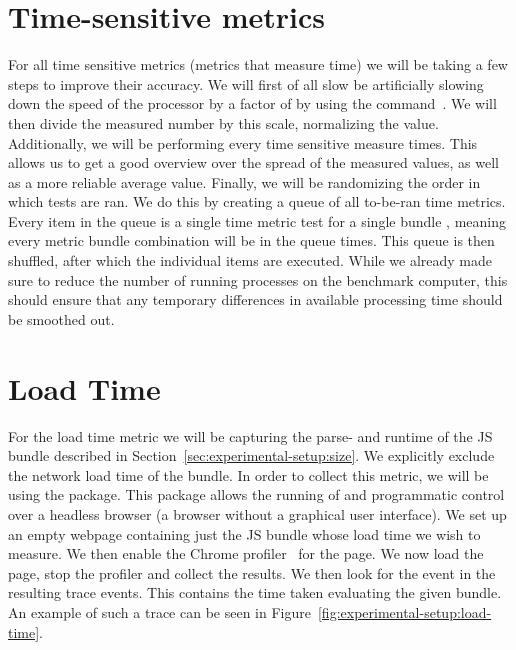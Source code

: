 \section{Time-sensitive metrics}\label{sec:experimental-setup:time-sensitive-metrics}
For all time sensitive metrics (metrics that measure time) we will be taking a few steps to improve their accuracy. We will first of all slow be artificially slowing down the speed of the processor by a factor of \slowdownFactor{} by using the  command~. We will then divide the measured number by this scale, normalizing the value. Additionally, we will be performing every time sensitive measure \numMeasures{} times. This allows us to get a good overview over the spread of the measured values, as well as a more reliable average value. Finally, we will be randomizing the order in which tests are ran. We do this by creating a queue of all to-be-ran time metrics. Every item in the queue is a single time metric test for a single bundle , meaning every metric bundle combination will be in the queue \numMeasures{} times. This queue is then shuffled, after which the individual items are executed. While we already made sure to reduce the number of running processes on the benchmark computer, this should ensure that any temporary differences in available processing time should be smoothed out.

\section{Load Time}
For the load time metric we will be capturing the parse- and runtime of the JS bundle described in Section~\ref{sec:experimental-setup:size}. We explicitly exclude the network load time of the bundle. In order to collect this metric, we will be using the  package. This package allows the running of and programmatic control over a headless browser (a browser without a graphical user interface). We set up an empty webpage containing just the JS bundle whose load time we wish to measure. We then enable the Chrome profiler~ for the page. We now load the page, stop the profiler and collect the results. We then look for the  event in the resulting trace events. This contains the time taken evaluating the given bundle. An example of such a trace can be seen in Figure~\ref{fig:experimental-setup:load-time}.

